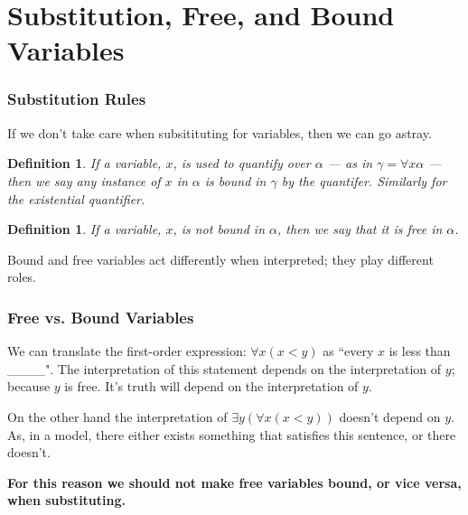 \documentclass{beamer}
\theoremstyle{indentDefn} \newtheorem{defn}[]{Definition}
\begin{document}
\section{Substitution, Free, and Bound Variables}

\begin{frame}
	\frametitle{Substitution Rules}
	
	If we don't take care when subsitituting for variables, then we can go astray. 
	
	\vspace{0.5cm}
	
	\begin{defn} If a variable, $x$, is used to quantify over $\alpha$ --- as in $\gamma = \forall x \alpha$ --- then we say any instance of $x$ in $\alpha$ is \emph{bound} in $\gamma$ by the quantifer. Similarly for the existential quantifier.  \end{defn}
	
	\vspace{0.5cm} 
		
	\begin{defn} If a variable, $x$, is not bound in $\alpha$, then we say that it is free in $\alpha$.\end{defn}
		
	\vspace{0.5cm} 
	
	Bound and free variables act differently when interpreted; they play different roles. 
	

	
\end{frame}

\begin{frame}
	\frametitle{Free vs. Bound Variables}
	
	We can translate the first-order expression: $\forall x (x < y)$ as ``every $x$ is less than \_\_\_\_". The interpretation of this statement depends on the interpretation of $y$; because $y$ is free. It's truth will depend on the interpretation of $y$.
	
	\vspace{0.5cm} 
	
	On the other hand the interpretation of $\exists y (\forall x (x < y))$ doesn't depend on $y$. As, in a model, there either exists something that satisfies this sentence, or there doesn't. 
	
	\vspace{0.5cm}

	{\bf For this reason we should not make free variables bound, or vice versa, when substituting.}
	
	
\end{frame}
\end{document}
